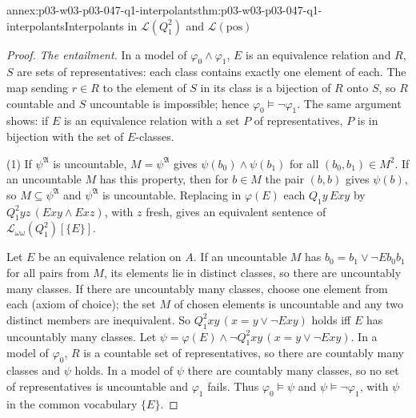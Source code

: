 \begin{annexitem}{annex:p03-w03-p03-047-q1-interpolants}{thm:p03-w03-p03-047-q1-interpolants}{Interpolants in \(\mathscr L(Q_1^2)\) and \(\mathscr L(\mathrm{pos})\)}
\begin{proof}
\emph{The entailment.}  In a model of \(\varphi_0\land\varphi_1\), \(E\) is an
equivalence relation and \(R\), \(S\) are sets of representatives: each class
contains exactly one element of each.  The map sending \(r\in R\) to the
element of \(S\) in its class is a bijection of \(R\) onto \(S\), so
\(R\) countable and \(S\) uncountable is impossible; hence
\(\varphi_0\models\neg\varphi_1\).  The same argument shows: if \(E\) is an
equivalence relation with a set \(P\) of representatives, \(P\) is in
bijection with the set of \(E\)-classes.

(1) If \(\psi^{\mathfrak A}\) is uncountable, \(M=\psi^{\mathfrak A}\) gives
\(\psi(b_0)\land\psi(b_1)\) for all \((b_0,b_1)\in M^2\).  If an uncountable
\(M\) has this property, then for \(b\in M\) the pair \((b,b)\) gives
\(\psi(b)\), so \(M\subseteq\psi^{\mathfrak A}\) and \(\psi^{\mathfrak A}\)
is uncountable.  Replacing in \(\varphi(E)\) each \(Q_1y\,Exy\) by
\(Q_1^2yz\,(Exy\land Exz)\), with \(z\) fresh, gives an equivalent
sentence of \(\mathscr L_{\omega\omega}(Q_1^2)[\{E\}]\).

Let \(E\) be an equivalence relation on \(A\).  If an uncountable \(M\) has
\(b_0=b_1\lor\neg Eb_0b_1\) for all pairs from \(M\), its elements lie in
distinct classes, so there are uncountably many classes.  If there are
uncountably many classes, choose one element from each (axiom of choice);
the set \(M\) of chosen elements is uncountable and any two distinct members
are inequivalent.  So \(Q_1^2xy\,(x=y\lor\neg Exy)\) holds iff \(E\) has
uncountably many classes.  Let \(\psi=\varphi(E)\land\neg Q_1^2xy\,(x=y\lor\neg Exy)\).
In a model of \(\varphi_0\), \(R\) is a countable set of representatives, so
there are countably many classes and \(\psi\) holds.  In a model of \(\psi\)
there are countably many classes, so no set of representatives is
uncountable and \(\varphi_1\) fails.  Thus \(\varphi_0\models\psi\) and
\(\psi\models\neg\varphi_1\), with \(\psi\) in the common vocabulary
\(\{E\}\).


\end{proof}
\end{annexitem}
